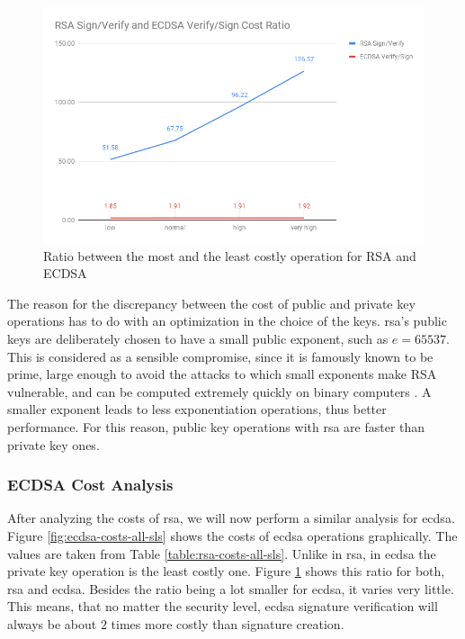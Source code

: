 \documentclass{llncs}
\begin{document}
\begin{figure}
  \centering
  \includegraphics[width=1.0\textwidth]{img/rsa_ecdsa_operation_ratio.png}
  \centering \caption{\label{fig:rsa-ecdsa-pub-priv-ratio} Ratio between the most and the least costly operation for RSA and ECDSA}
\end{figure}

The reason for the discrepancy between the cost of public and private key operations has to do with an optimization
in the choice of the keys. \gls{rsa}'s public keys are deliberately chosen to have a small public exponent, such as $e=65537$. This is considered as a
sensible compromise, since it is famously known to be prime, large enough to avoid the attacks to which
small exponents make RSA vulnerable, and can be computed extremely quickly on binary computers \cite{boneh2002fast}\cite{muir2006seifert}.
A smaller exponent leads to less exponentiation operations, thus better performance. For this reason, public
key operations with \gls{rsa} are faster than private key ones.

\subsubsection{ECDSA Cost Analysis}

After analyzing the costs of \gls{rsa}, we will now perform a similar analysis for \gls{ecdsa}. Figure \ref{fig:ecdsa-costs-all-sls}
shows the costs of \gls{ecdsa} operations graphically. The values are taken from Table \ref{table:rsa-costs-all-sls}. Unlike in \gls{rsa},
in \gls{ecdsa} the private key operation is the least costly one. Figure \ref{fig:rsa-ecdsa-pub-priv-ratio} shows this ratio for both,
\gls{rsa} and \gls{ecdsa}. Besides the ratio being a lot smaller for \gls{ecdsa}, it varies very little. This means, that no matter
the security level, \gls{ecdsa} signature verification will always be about $2$ times more costly than signature creation.
\end{document}
